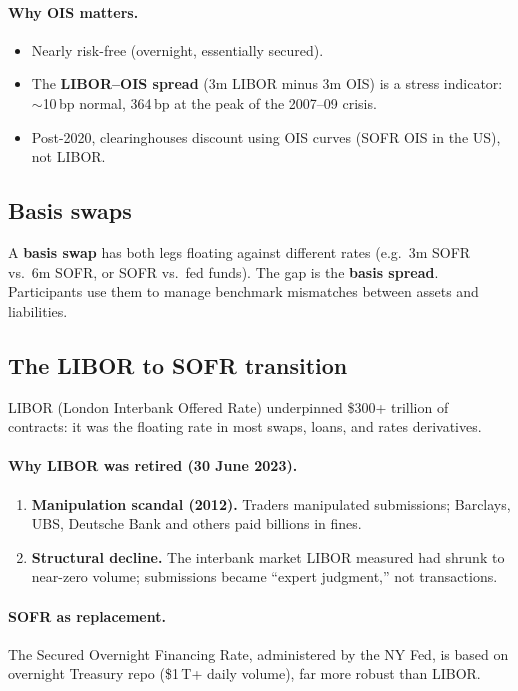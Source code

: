 \paragraph{Why OIS matters.}
\begin{itemize}
  \item Nearly risk-free (overnight, essentially secured).
  \item The \textbf{LIBOR--OIS spread} (3m LIBOR minus 3m OIS) is a
    stress indicator: $\sim$10\,bp normal, 364\,bp at the peak of the
    2007--09 crisis.
  \item Post-2020, clearinghouses discount using OIS curves (SOFR OIS
    in the US), not LIBOR.
\end{itemize}

\subsection{Basis swaps}

A \textbf{basis swap} has both legs floating against different rates
(e.g.\ 3m SOFR vs.\ 6m SOFR, or SOFR vs.\ fed funds).  The gap is
the \textbf{basis spread}.  Participants use them to manage benchmark
mismatches between assets and liabilities.

\subsection{The LIBOR to SOFR transition}

LIBOR (London Interbank Offered Rate) underpinned \$300+ trillion of
contracts: it was the floating rate in most swaps, loans, and rates
derivatives.

\paragraph{Why LIBOR was retired (30 June 2023).}
\begin{enumerate}
  \item \textbf{Manipulation scandal (2012).}  Traders manipulated
    submissions; Barclays, UBS, Deutsche Bank and others paid
    billions in fines.
  \item \textbf{Structural decline.}  The interbank market LIBOR
    measured had shrunk to near-zero volume; submissions became
    ``expert judgment,'' not transactions.
\end{enumerate}

\paragraph{SOFR as replacement.}
The Secured Overnight Financing Rate, administered by the NY Fed, is
based on overnight Treasury repo (\$1\,T+ daily volume), far more
robust than LIBOR.

